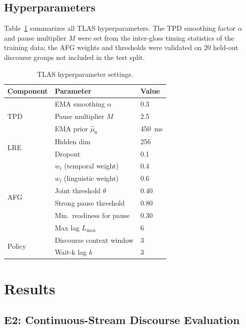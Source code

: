 \documentclass[conference]{IEEEtran}
\begin{document}
\subsection{Hyperparameters}

Table~\ref{tab:hyperparams} summarizes all TLAS hyperparameters. The TPD smoothing factor $\alpha$ and pause multiplier $M$ were set from the inter-gloss timing statistics of the training data; the AFG weights and thresholds were validated on 20 held-out discourse groups not included in the test split.

\begin{table}[t]
\centering
\caption{TLAS hyperparameter settings.}
\label{tab:hyperparams}
\begin{tabular}{lll}
\toprule
\textbf{Component} & \textbf{Parameter} & \textbf{Value} \\
\midrule
\multirow{3}{*}{TPD} & EMA smoothing $\alpha$ & 0.3 \\
                     & Pause multiplier $M$ & 2.5 \\
                     & EMA prior $\hat{\mu}_0$ & 450~ms \\
\midrule
\multirow{2}{*}{LRE} & Hidden dim & 256 \\
                     & Dropout & 0.1 \\
\midrule
\multirow{6}{*}{AFG} & $w_t$ (temporal weight) & 0.4 \\
                     & $w_l$ (linguistic weight) & 0.6 \\
                     & Joint threshold $\theta$ & 0.40 \\
                     & Strong pause threshold & 0.80 \\
                     & Min.\ readiness for pause & 0.30 \\
                     & Max lag $L_{\max}$ & 6 \\
\midrule
\multirow{2}{*}{Policy} & Discourse context window & 3 \\
                        & Wait-k lag $k$ & 3 \\
\bottomrule
\end{tabular}
\end{table}


\section{Results}

\subsection{E2: Continuous-Stream Discourse Evaluation}
\end{document}
